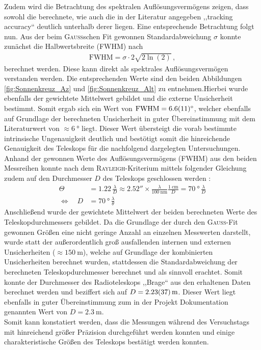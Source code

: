     Zudem wird die Betrachtung des spektralen Auflösungsvermögens zeigen, dass sowohl die berechnete, wie auch die in der Literatur angegeben ,,tracking accuracy`` deutlich unterhalb derer liegen.
    Eine entsprechende Betrachtung folgt nun.
    Aus der beim \textsc{Gauß}schen Fit gewonnen Standardabweichung $\sigma$ konnte zunächst die Halbwertsbreite (FWHM) nach \cite{wiki:FWHM}
    \begin{align}
        \text{FWHM} = \sigma \cdot 2\sqrt{2\ln(2)} \, , \label{eq:FWHM}
    \end{align}
    berechnet werden.
    Diese kann direkt als spektrales Auflösungsvermögen verstanden werden.
    Die entsprechenden Werte sind den beiden Abbildungen \ref{fig:Sonnenkreuz_Az} und \ref{fig:Sonnenkreuz_Alt} zu entnehmen.Hierbei wurde ebenfalls der gewichtete Mittelwert gebildet und die externe Unsicherheit bestimmt.
    Somit ergab sich ein Wert von $\text{FWHM} = \SI{6.6 \pm 1.1}{\degree}$, welcher ebenfalls auf Grundlage der berechneten Unsicherheit in guter Übereinstimmung mit dem Literaturwert von $\approx \SI{6}{\degree}$ \cite{Usermanual} liegt. 
    Dieser Wert übersteigt die vorab bestimmte intrinsische Ungenauigkeit deutlich und bestötigt somit die hinreichende Genauigkeit des Teleskops für die nachfolgend dargelegten Untersuchungen.\\

    Anhand der gewonnen Werte des Auflösungsvermögens (FWHM) aus den beiden Messreihen konnte nach dem \textsc{Rayleigh}-Kriterium mittels folgender Gleichung zudem auf den Durchmesser $D$ des Teleskops geschlossen werden \cite{Karttunen2013}:
    \begin{align}
        \Theta &= 1.22 \, \frac{\lambda}{D} \approx \ang{;;2.52} \times \frac{\lambda}{\SI{100}{\nano \metre}} \frac{\SI{1}{\centi \metre}}{D} = \SI{70}{\degree} \, \frac{\lambda}{D}\\
        \Leftrightarrow \quad D &= \SI{70}{\degree} \, \frac{\lambda}{\theta}
    \end{align}
    Anschließend wurde der gewichtete Mittelwert der beiden berechneten Werte des Teleskopdurchmessers gebildet. Da die Grundlage der durch den \textsc{Gauß}-Fit gewonnen Größen eine nicht geringe Anzahl an einzelnen Messwerten darstellt, wurde statt der außerordentlich groß ausfallenden internen und externen Unsicherheiten ($\approx \SI{150}{\metre}$), welche auf Grundlage der kombinierten Unsicherheiten berechnet wurden, stattdessen die Standardabweichung der berechneten Teleskopdurchmesser berechnet und als sinnvoll erachtet. Somit konnte der Durchmesser des Radioteleskops ,,Brage`` aus den erhaltenen Daten berechnet werden und beziffert sich auf $D = \SI{2.23 \pm 0.37}{\metre}$. Dieser Wert liegt ebenfalls in guter Übereinstimmung zum in der Projekt Dokumentation \cite{Usermanual} genannten Wert von $D = \SI{2.3}{\metre}$. \\    
    
    Somit kann konstatiert werden, dass die Messungen während des Versuchstags mit hinreichend größer Präzision durchgeführt werden konnten und einige charakteristische Größen des Teleskops bestätigt werden konnten.